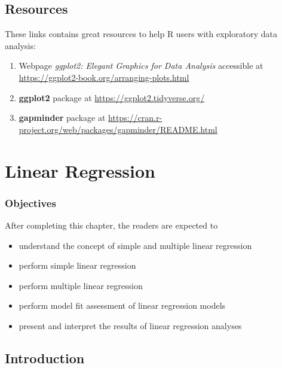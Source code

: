 \documentclass[
  10pt,
]{krantz}
\providecommand{\tightlist}{%
  \setlength{\itemsep}{0pt}\setlength{\parskip}{0pt}}
\begin{document}
\hypertarget{resources-1}{%
\section{Resources}\label{resources-1}}

These links contains great resources to help R users with exploratory data analysis:

\begin{enumerate}
\def\labelenumi{\arabic{enumi}.}
\tightlist
\item
  Webpage \emph{ggplot2: Elegant Graphics for Data Analysis} accessible at \url{https://ggplot2-book.org/arranging-plots.html}
\item
  \textbf{ggplot2} package at \url{https://ggplot2.tidyverse.org/}
\item
  \textbf{gapminder} package at \url{https://cran.r-project.org/web/packages/gapminder/README.html}
\end{enumerate}

\hypertarget{linear-regression}{%
\chapter{\texorpdfstring{Linear Regression}{Linear Regression}}\label{linear-regression}}

\hypertarget{objectives-5}{%
\subsection{Objectives}\label{objectives-5}}

After completing this chapter, the readers are expected to

\begin{itemize}
\tightlist
\item
  understand the concept of simple and multiple linear regression
\item
  perform simple linear regression
\item
  perform multiple linear regression
\item
  perform model fit assessment of linear regression models
\item
  present and interpret the results of linear regression analyses
\end{itemize}

\hypertarget{introduction-2}{%
\section{Introduction}\label{introduction-2}}
\end{document}
